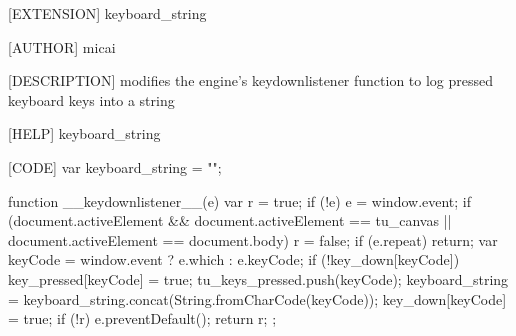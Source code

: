 [EXTENSION]
keyboard_string

[AUTHOR]
micai

[DESCRIPTION]
modifies the engine's 
keydownlistener function
to log pressed keyboard keys
into a string

[HELP]
keyboard_string

[CODE]
var keyboard_string = "";

function __keydownlistener__(e) {
	var r = true;
	if (!e) e = window.event;
	if (document.activeElement && document.activeElement == tu_canvas || document.activeElement == document.body) r = false;
	if (e.repeat) return;
	var keyCode = window.event ? e.which : e.keyCode;
	if (!key_down[keyCode]) {
		key_pressed[keyCode] = true;
		tu_keys_pressed.push(keyCode);
		keyboard_string = keyboard_string.concat(String.fromCharCode(keyCode));
	}
	key_down[keyCode] = true;
	if (!r) e.preventDefault();
	return r;
};

